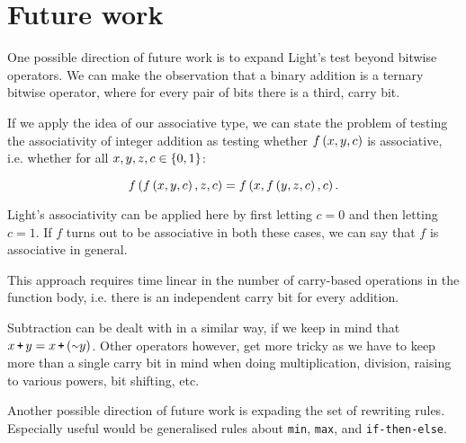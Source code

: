 \section{Future work}

One possible direction of future work is to expand Light's test beyond bitwise
operators. We can make the observation that a binary addition is a ternary
bitwise operator, where for every pair of bits there is a third, carry bit.

If we apply the idea of our associative type, we can state the problem of
testing the associativity of integer addition as testing whether $f\left({x,y,c}\right)$
is associative, i.e. whether for all $x,y,z,c\in \left\{{0,1}\right\}$:

\[f\left({f\left({x,y,c}\right), z,c}\right) = f\left({x, f\left({y,z,c}\right),c}\right).\]

Light's associativity can be applied here by first letting $c=0$ and then
letting $c=1$. If $f$ turns out to be associative in both these cases, we can
say that $f$ is associative in general.

This approach requires time linear in the number of carry-based operations in
the function body, i.e. there is an independent carry bit for every addition.

Subtraction can be dealt with in a similar way, if we keep in mind that $x\lp
y=x \lp(\lneg y)$. Other operators however, get more tricky as we have to keep
more than a single carry bit in mind when doing multiplication, division,
raising to various powers, bit shifting, etc.

Another possible direction of future work is expading the set of rewriting
rules. Especially useful would be generalised rules about \texttt{min},
\texttt{max}, and \texttt{if-then-else}.

